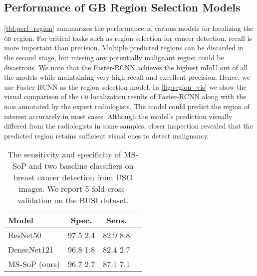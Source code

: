 \documentclass[10pt,twocolumn,letterpaper]{article}
\def\gb{\textsc{gb}\xspace}
\def\rois{\textsc{roi}s\xspace}
\begin{document}
\subsection{Performance of GB Region Selection Models}
\cref{tbl:perf_region} summarizes the performance of various models for localizing the \gb region. For critical tasks such as region selection for cancer detection, recall is more important than precision. Multiple predicted regions can be discarded in the second stage, but missing any potentially malignant region could be disastrous. We note that the Faster-RCNN achieves the highest mIoU out of all the models while maintaining very high recall and excellent precision. Hence, we use Faster-RCNN as the region selection model. In \cref{fig:region_vis} we show the visual comparison of the \gb localization results of Faster-RCNN along with the \rois annotated by the expert radiologists. The model could predict the region of interest accurately in most cases. Although the model's prediction visually differed from the radiologists in some samples, closer inspection revealed that the predicted region retains sufficient visual cues to detect malignancy. 

\begin{table}[t]
	\centering
    \begin{tabular}{@{}lccc@{}}
    \toprule[1pt]
    \textbf{Model} & \textbf{Spec.} & \textbf{Sens.} \\
    \midrule[0.5pt]
    ResNet50 &  97.5  2.4 & 82.9  8.8\\
    DenseNet121  & 96.8  1.8 & 82.4  2.7 \\
    \midrule[0.5pt]
    MS-SoP (ours) & 96.7  2.7 & 87.1  7.1 \\
    \bottomrule[1pt]
    \end{tabular}
	\caption{The sensitivity and specificity of MS-SoP and two baseline classifiers on breast cancer detection from USG images. We report 5-fold cross-validation on the BUSI dataset.}
\label{tbl:busi}
\end{table}
\end{document}
